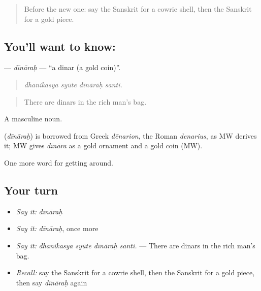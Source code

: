 \label{lesson:SA-C435-dinarah}



\begin{quote}
Before the new one: say the Sanskrit for a cowrie shell, then the Sanskrit for a gold piece.
\end{quote}

\subsection*{You'll want to know: }
\textbf{} — \emph{dīnāraḥ} — \textquotedblleft{}a dinar (a gold coin)\textquotedblright{}.

\begin{quote}
   
\end{quote}

\begin{quote}
\emph{dhanikasya syūte dīnārāḥ santi.}
\end{quote}

\begin{quote}
There are dinars in the rich man's bag.
\end{quote}

A masculine noun.

\begin{cousinweb}
\textbf{} (\emph{dīnāraḥ}) is borrowed from Greek \emph{dēnarion}, the Roman \emph{denarius}, as MW derives it; MW gives \emph{dīnāra} as a gold ornament and a gold coin (MW).
\end{cousinweb}

\begin{grammarlens}[title={What you've built}]
One more word for getting around.
\end{grammarlens}

\subsection*{Your turn}
\begin{itemize}
\raggedright
  \item \emph{Say it:} \emph{dīnāraḥ}
  \item \emph{Say it:} \emph{dīnāraḥ}, once more
  \item \emph{Say it:} \emph{dhanikasya syūte dīnārāḥ santi.} — There are dinars in the rich man's bag.
  \item \emph{Recall:} say the Sanskrit for a cowrie shell, then the Sanskrit for a gold piece, then say \emph{dīnāraḥ} again
\end{itemize}

